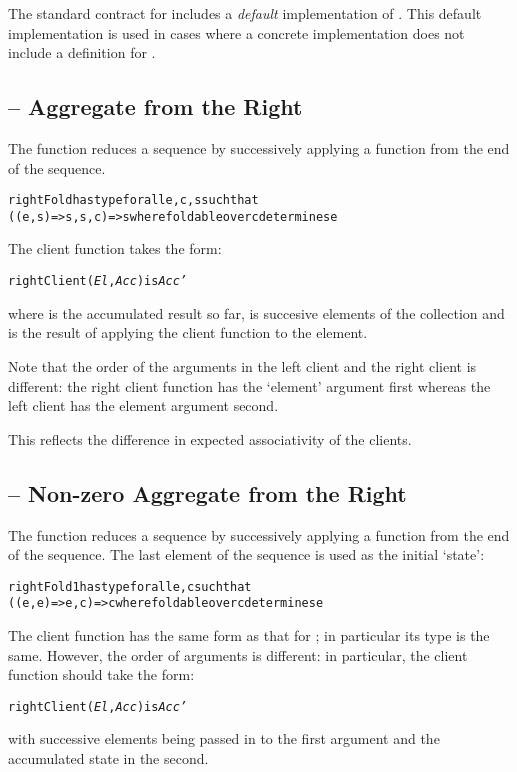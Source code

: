 \begin{aside}
The standard contract for  includes a \emph{default} implementation of . This default implementation is used in cases where a concrete implementation does not include a definition for .
\end{aside}

\subsection{ -- Aggregate from the Right}
\label{rightFold}
The  function reduces a sequence by successively applying a function from the end of the sequence.
\begin{alltt}
rightFold has type for all e,c,s such that
    ((e,s)=>s,s,c) => s where foldable over c determines e
\end{alltt}
The client function takes the form:
\begin{alltt}
rightClient(\emph{El},\emph{Acc}) is \emph{Acc'}
\end{alltt}
where  is the accumulated result so far,  is succesive elements of the collection and  is the result of applying the client function to the element.

\begin{aside}
Note that the order of the arguments in the left client and the right client is different: the right client function has the `element' argument first whereas the left client has the element argument second.

This reflects the difference in expected associativity of the clients.
\end{aside}

\subsection{ -- Non-zero Aggregate from the Right}
\label{rightFold1}
The  function reduces a sequence by successively applying a function from the end of the sequence. The last element of the sequence is used as the initial `state':
\begin{alltt}
rightFold1 has type for all e,c such that
    ((e,e)=>e,c) => c where foldable over c determines e
\end{alltt}

\begin{aside}
The client function has the same form as that for ; in particular its type is the same. However, the order of arguments is different: in particular, the client function should take the form:
\begin{alltt}
rightClient(\emph{El},\emph{Acc}) is \emph{Acc'}
\end{alltt}
with successive elements being passed in to the first argument and the accumulated state in the second.
\end{aside}

